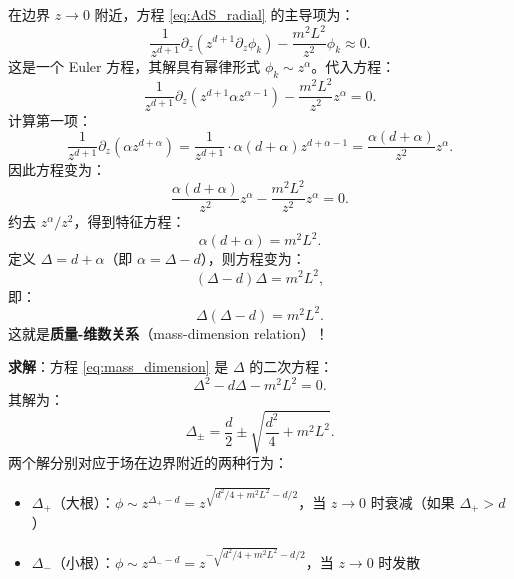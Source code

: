 在边界 $z \to 0$ 附近，方程 \eqref{eq:AdS_radial} 的主导项为：
\begin{equation}
    \frac{1}{z^{d+1}} \partial_z \left(z^{d+1} \partial_z \phi_k\right) - \frac{m^2 L^2}{z^2} \phi_k \approx 0.
\end{equation}
这是一个 Euler 方程，其解具有幂律形式 $\phi_k \sim z^\alpha$。代入方程：
\begin{equation}
    \frac{1}{z^{d+1}} \partial_z \left(z^{d+1} \alpha z^{\alpha-1}\right) - \frac{m^2 L^2}{z^2} z^\alpha = 0.
\end{equation}
计算第一项：
\begin{equation}
    \frac{1}{z^{d+1}} \partial_z \left(\alpha z^{d+\alpha}\right) = \frac{1}{z^{d+1}} \cdot \alpha(d+\alpha) z^{d+\alpha-1} = \frac{\alpha(d+\alpha)}{z^2} z^\alpha.
\end{equation}
因此方程变为：
\begin{equation}
    \frac{\alpha(d+\alpha)}{z^2} z^\alpha - \frac{m^2 L^2}{z^2} z^\alpha = 0.
\end{equation}
约去 $z^\alpha/z^2$，得到特征方程：
\begin{equation}
    \alpha(d+\alpha) = m^2 L^2.
\end{equation}
定义 $\Delta = d + \alpha$（即 $\alpha = \Delta - d$），则方程变为：
\begin{equation}
    (\Delta - d) \Delta = m^2 L^2,
\end{equation}
即：
\begin{equation}
    \Delta(\Delta - d) = m^2 L^2.
    \label{eq:mass_dimension}
\end{equation}
这就是\textbf{质量-维数关系}（mass-dimension relation）！

\textbf{求解}：方程 \eqref{eq:mass_dimension} 是 $\Delta$ 的二次方程：
\begin{equation}
    \Delta^2 - d\Delta - m^2 L^2 = 0.
\end{equation}
其解为：
\begin{equation}
    \Delta_\pm = \frac{d}{2} \pm \sqrt{\frac{d^2}{4} + m^2 L^2}.
\end{equation}
两个解分别对应于场在边界附近的两种行为：
\begin{itemize}
    \item $\Delta_+$（大根）：$\phi \sim z^{\Delta_+ - d} = z^{\sqrt{d^2/4 + m^2 L^2} - d/2}$，当 $z \to 0$ 时衰减（如果 $\Delta_+ > d$）
    \item $\Delta_-$（小根）：$\phi \sim z^{\Delta_- - d} = z^{-\sqrt{d^2/4 + m^2 L^2} - d/2}$，当 $z \to 0$ 时发散
\end{itemize}

